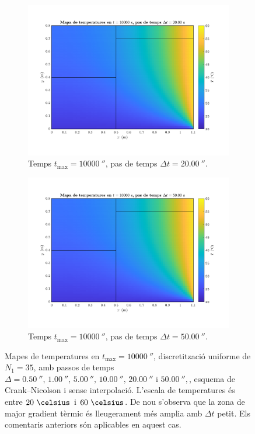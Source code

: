 \begin{figure}[ht]
\begin{subfigure}{.5\textwidth}
	\end{subfigure}
	\begin{subfigure}{.5\textwidth}
		\centering
		\includegraphics[width=.95\linewidth]{imagenes/04_influencia/pas_temps/pas_temps_17.pdf}
		\vspace{-15pt}
		\caption{Temps $t_\text{max} = 10000 \ \second$, pas de temps $\Delta t = 20.00 \ \second$.}
		\label{fig:pas_temps_17}
	\end{subfigure}%
	\begin{subfigure}{.5\textwidth}
		\centering
		\includegraphics[width=.95\linewidth]{imagenes/04_influencia/pas_temps/pas_temps_18.pdf}
		\vspace{-15pt}
		\caption{Temps $t_\text{max} = 10000 \ \second$, pas de temps $\Delta t = 50.00 \ \second$.}
		\label{Temps fig:pas_temps_18}
	\end{subfigure}
	\caption{Mapes de temperatures en $t_\text{max} = 10000 \ \second$, discretització uniforme de $N_1 = 35$, amb passos de temps $\Delta = 0.50 \ \second, \, 1.00 \ \second, \, 5.00 \ \second, \, 10.00 \ \second, \, 20.00 \ \second$ i $50.00 \ \second,$, esquema de Crank--Nicolson i sense interpolació. L'escala de temperatures és entre $20 \ \celsius$ i $60 \ \celsius$. De nou s'observa que la zona de major gradient tèrmic és lleugerament més amplia amb $\Delta t$ petit. Els comentaris anteriors són aplicables en aquest cas.}	
	\label{fig:pas_temps_10000}
\end{figure} 